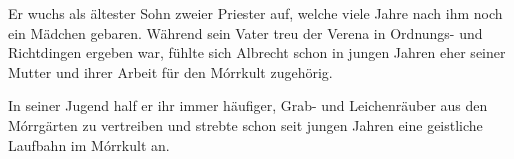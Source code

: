 
Er wuchs als ältester Sohn zweier Priester auf, welche viele Jahre nach ihm noch ein Mädchen gebaren. Während sein Vater treu der Verena in Ordnungs- und Richtdingen ergeben war, fühlte sich Albrecht schon in jungen Jahren eher seiner Mutter und ihrer Arbeit für den Mórrkult zugehörig.

In seiner Jugend half er ihr immer häufiger, Grab- und Leichenräuber aus den Mórrgärten zu vertreiben und strebte schon seit jungen Jahren eine geistliche Laufbahn im Mórrkult an.